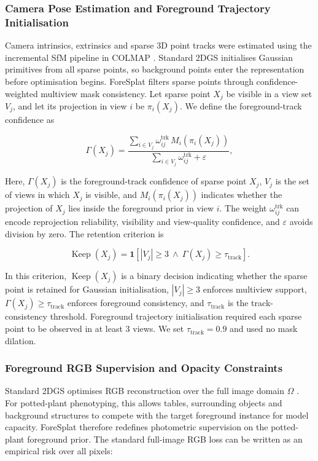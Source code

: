 \documentclass[a4paper]{cas-sc}
\begin{document}
\subsubsection{Camera Pose Estimation and Foreground Trajectory Initialisation}\label{sec:camera-pose-estimation-and-foreground-tr}

Camera intrinsics, extrinsics and sparse 3D point tracks were estimated using the incremental SfM pipeline in COLMAP \cite{ref16}. Standard 2DGS initialises Gaussian primitives from all sparse points, so background points enter the representation before optimisation begins. ForeSplat filters sparse points through confidence-weighted multiview mask consistency. Let sparse point \(X_j\) be visible in a view set \(V_j\), and let its projection in view \(i\) be \(\pi_i(X_j)\). We define the foreground-track confidence as

\[
\Gamma(X_j)=
\frac{\sum_{i\in V_j}\omega_{ij}^{\text{trk}}\,
M_i\!\left(\pi_i(X_j)\right)}
{\sum_{i\in V_j}\omega_{ij}^{\text{trk}}+\varepsilon},
\]

Here, \(\Gamma(X_j)\) is the foreground-track confidence of sparse point \(X_j\), \(V_j\) is the set of views in which \(X_j\) is visible, and \(M_i(\pi_i(X_j))\) indicates whether the projection of \(X_j\) lies inside the foreground prior in view \(i\). The weight \(\omega_{ij}^{\text{trk}}\) can encode reprojection reliability, visibility and view-quality confidence, and \(\varepsilon\) avoids division by zero. The retention criterion is

\[
\operatorname{Keep}(X_j)=\mathbf{1}\left[
|V_j|\geq 3\ \land\ \Gamma(X_j)\geq \tau_{\text{track}}
\right].
\]

In this criterion, \(\operatorname{Keep}(X_j)\) is a binary decision indicating whether the sparse point is retained for Gaussian initialisation, \(|V_j|\geq 3\) enforces multiview support, \(\Gamma(X_j)\geq\tau_{\text{track}}\) enforces foreground consistency, and \(\tau_{\text{track}}\) is the track-consistency threshold. Foreground trajectory initialisation required each sparse point to be observed in at least 3 views. We set \(\tau_{\text{track}}=0.9\) and used no mask dilation.

\subsubsection{Foreground RGB Supervision and Opacity Constraints}\label{sec:foreground-rgb-supervision-and-opacity-c}

Standard 2DGS optimises RGB reconstruction over the full image domain \(\Omega\) \cite{ref28}. For potted-plant phenotyping, this allows tables, surrounding objects and background structures to compete with the target foreground instance for model capacity. ForeSplat therefore redefines photometric supervision on the potted-plant foreground prior. The standard full-image RGB loss can be written as an empirical risk over all pixels:
\end{document}

